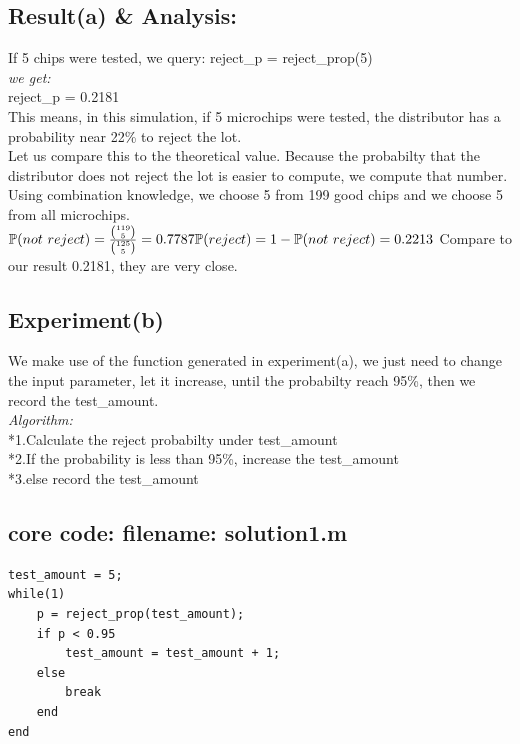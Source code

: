 \documentclass[twoside]{article}
\begin{document}
\subsection{\normalsize{Result(a) \& Analysis:}}
If 5 chips were tested, we query:
reject\_p = reject\_prop(5)\\
\emph{we get:}\\
reject\_p = 0.2181 \\
This means, in this simulation, if 5 microchips were tested, the distributor has a probability near 22\% to reject the lot.\\
Let us compare this to the theoretical value. Because the probabilty that the distributor does not reject the lot is easier to compute, we compute that number. Using combination knowledge, we choose 5 from 199 good chips and we choose 5 from all microchips.\\
$\mathbb{P}(not \ reject) = \frac{\binom {119}{5}}{\binom {125}{5}}=0.7787\\
\mathbb{P}(reject) = 1 - \mathbb{P}(not \ reject)=0.2213\\$
Compare to our result 0.2181, they are very close.\\

\subsection{\normalsize{Experiment(b)}}
We make use of the function generated in experiment(a), we just need to change the input parameter, let it increase, until the probabilty reach 95\%, then we record the test\_amount.\\[10pt]
\emph{Algorithm:}\\[10pt]
*1.Calculate the reject probabilty under test\_amount\\
*2.If the probability is less than 95\%, increase the test\_amount\\
*3.else record the test\_amount\\
\subsection{\normalsize{core code:  filename: solution1.m}}
\begin{lstlisting}
test_amount = 5;
while(1)
    p = reject_prop(test_amount);
    if p < 0.95
        test_amount = test_amount + 1;
    else
        break
    end
end
\end{lstlisting}
\end{document}
